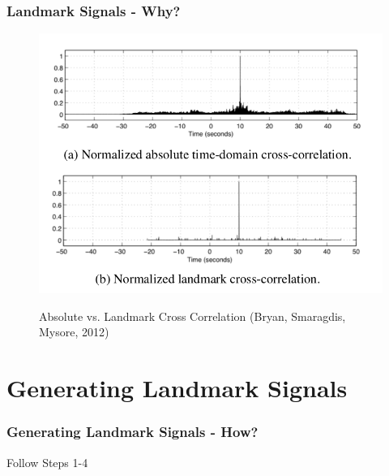 \documentclass{beamer}
\begin{document}



\begin{frame}
\frametitle{Landmark Signals - Why?}
\begin{figure}
\begin{center}
\includegraphics[scale=0.23]{pngs/02_absolute_vs_landmark.png} \\
\caption{Absolute vs. Landmark Cross Correlation (Bryan, Smaragdis, Mysore, 2012)}
\end{center}
\end{figure}
\end{frame}


\section{Generating Landmark Signals}
\begin{frame}
\frametitle{Generating Landmark Signals - How?}
\begin{center}
Follow Steps 1-4
\end{center}
\end{frame}

\end{document}
